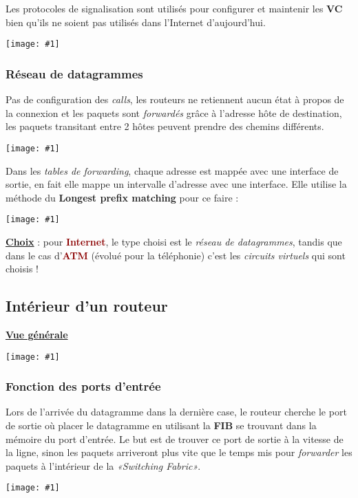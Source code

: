 \documentclass{article}
\newcommand{\dred}[1]{\textcolor{darkred}{\textbf{#1}}}
\newcommand{\imgR}[2]{\begin{center}\texttt{[image: \#1]}\end{center}}
\begin{document}
Les protocoles de signalisation sont utilisés pour configurer et maintenir les \textbf{VC} bien qu'ils ne soient
pas utilisés dans l'Internet d'aujourd'hui.

\imgR{CN_070.png}{300}

\subsubsection{Réseau de datagrammes}

Pas de configuration des \textit{calls}, les routeurs ne retiennent aucun état à propos de la connexion et les 
paquets sont \textit{forwardés} grâce à l'adresse hôte de destination, les paquets transitant entre 2 hôtes
peuvent prendre des chemins différents.

\imgR{CN_071.png}{300}

Dans les \textit{tables de forwarding}, chaque adresse est mappée avec une interface de sortie, en fait elle 
mappe un intervalle d'adresse avec une interface. Elle utilise la méthode du \textbf{Longest prefix matching} 
pour ce faire : \\

\imgR{CN_072.png}{300}

\textbf{\underline{Choix}} : pour \dred{Internet}, le type choisi est le \textit{réseau de datagrammes}, tandis 
que dans le cas d'\dred{ATM} (évolué pour la téléphonie) c'est les \textit{circuits virtuels} qui sont 
choisis !

\subsection{Intérieur d'un routeur}

\textbf{\underline{Vue générale}}
\imgR{CN_073.png}{300}

\subsubsection{Fonction des ports d'entrée}

\begin{multicols}{2}
Lors de l'arrivée du datagramme dans la dernière case, le routeur cherche le port de sortie où placer le 
datagramme en utilisant la \textbf{FIB} se trouvant dans la mémoire du port d'entrée. Le but est de trouver ce 
port de sortie à la vitesse de la ligne, sinon les paquets arriveront plus vite que le temps mis pour 
\textit{forwarder} les paquets à l'intérieur de la \textit{«Switching Fabric»}.
\imgR{CN_074.png}{235}
\end{multicols}
\end{document}
